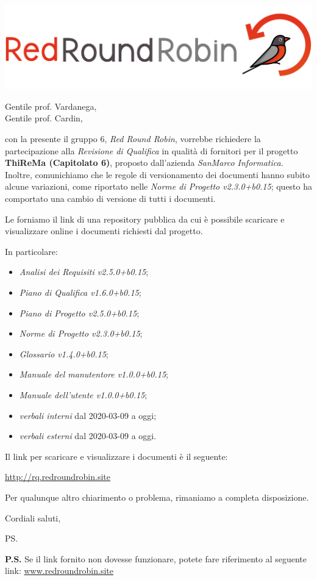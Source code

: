 \documentclass[12pt]{letter}
\date{13 aprile 2020}
\begin{document}
\begin{letter}{ }

\includegraphics[scale=0.17]{images/logo.png}

\opening{Gentile prof. Vardanega,\\ Gentile prof. Cardin, }

con la presente il gruppo 6, \textit{Red Round Robin}, vorrebbe richiedere la partecipazione alla \textit{Revisione di Qualifica} in qualità di fornitori per il progetto \textbf{ThiReMa (Capitolato 6)}, proposto dall'azienda \textit{SanMarco Informatica}.
\newline
Inoltre, comunichiamo che le regole di versionamento dei documenti hanno subito alcune variazioni, come riportato nelle \textit{Norme di Progetto v2.3.0+b0.15}; questo ha comportato una cambio di versione di tutti i documenti.

Le forniamo il link di una repository pubblica da cui è possibile scaricare e visualizzare online i documenti richiesti dal progetto.

In particolare:

\begin{itemize}
  \item \textit{Analisi dei Requisiti v2.5.0+b0.15};
	\item \textit{Piano di Qualifica v1.6.0+b0.15};
	\item \textit{Piano di Progetto v2.5.0+b0.15};
	\item \textit{Norme di Progetto v2.3.0+b0.15};
	\item \textit{Glossario v1.4.0+b0.15};
	\item \textit{Manuale del manutentore v1.0.0+b0.15};
	\item \textit{Manuale dell'utente v1.0.0+b0.15};
	\item \textit{verbali interni} dal 2020-03-09 a oggi;
	\item \textit{verbali esterni} dal 2020-03-09 a oggi.
\end{itemize}

Il link per scaricare e visualizzare i documenti è il seguente:

\begin{center}
\href{}{http://rq.redroundrobin.site}
\end{center}


Per qualunque altro chiarimento o problema, rimaniamo a completa disposizione.

\closing{Cordiali saluti,}


\vspace{3em}
\ps

\textbf{P.S.} Se il link fornito non dovesse funzionare, potete fare riferimento al seguente link:
\href{https://www.redroundrobin.site}{www.redroundrobin.site}

\end{letter}
\end{document}

